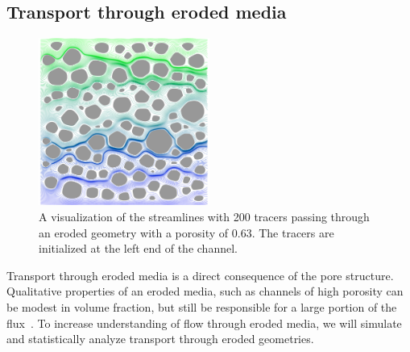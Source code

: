 \documentclass[12pt]{article}
\begin{document}
\subsection{Transport through eroded media}
\begin{figure}
  \includegraphics[width=0.5\textwidth]{figs/100b_t100tracer}
  \caption{\label{fig:100tracers} A visualization of the streamlines
  with 200 tracers passing through an eroded geometry with a porosity of
  0.63. The tracers are initialized at the left end of the channel.}
\end{figure}
Transport through eroded media is a direct consequence of the pore
structure. Qualitative properties of an eroded media, such as channels
of high porosity can be modest in volume fraction, but still be
responsible for a large portion of the flux~\cite{Quaife2018}. To
increase understanding of flow through eroded media, we will simulate
and statistically analyze transport through eroded geometries.
\end{document}
